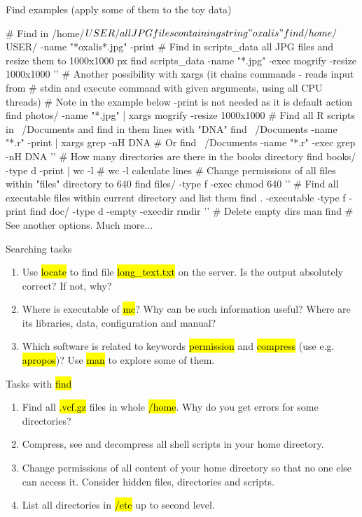 \documentclass[compress, ucs, xelatex, 11pt, xcolor=svgnames, aspectratio=169,
	hyperref={
		bookmarks=true,
		unicode=true,
		colorlinks=true,
		pdftitle={Linux, command line and MetaCentrum},
		plainpages=false,
		pdfauthor={Vojtech Zeisek},
		pdfsubject={Course about use of Linux command line, writing shell scripts and using MetaCentrum of CESNET},
		pdfcreator={XeLaTeX},
		pdfkeywords={Linux, GNU, BASH, shell, command line, MetaCentrum},
		linkcolor=DarkRed, %
		anchorcolor=DarkBlue, %
		citecolor=Indigo, %
		filecolor=NavyBlue, %
		menucolor=DarkMagenta, %
		urlcolor=DarkBlue, %
		pdftex},
	url={hyphens, lowtilde} %
	]{beamer}
\renewcommand{\texttt}[1]{\hl{\ttfamily #1}}
\begin{document}
\begin{frame}[fragile]{Find examples (apply some of them to the toy data)}
	\begin{bashcode}
    # Find in /home/$USER/ all JPG files containing string "oxalis"
    find /home/$USER/ -name "*oxalis*.jpg" -print
    # Find in scripts_data all JPG files and resize them to 1000x1000 px
    find scripts_data -name "*.jpg" -exec mogrify -resize 1000x1000 '{}' \;
    # Another possibility with xargs (it chains commands - reads input from
    # stdin and execute command with given arguments, using all CPU threads)
    # Note in the example below -print is not needed as it is default action
    find photos/ -name "*.jpg" | xargs mogrify -resize 1000x1000
    # Find all R scripts in ~/Documents and find in them lines with "DNA"
    find ~/Documents -name "*.r" -print | xargs grep -nH DNA # Or
    find ~/Documents -name "*.r" -exec grep -nH DNA '{}' \;
    # How many directories are there in the books directory
    find books/ -type d -print | wc -l # wc -l calculate lines
    # Change permissions of all files within "files" directory to 640
    find files/ -type f -exec chmod 640 '{}' \;
    # Find all executable files within current directory and list them
    find . -executable -type f -print
    find doc/ -type d -empty -execdir rmdir '{}' \; # Delete empty dirs
    man find # See another options. Much more...
	\end{bashcode}
\end{frame}

\begin{frame}{Searching tasks}
	\begin{enumerate}
		\item Use \texttt{locate} to find file \texttt{long\_text.txt} on the server. Is the output absolutely correct? If not, why?
		\item Where is executable of \texttt{mc}? Why can be such information useful? Where are its libraries, data, configuration and manual?
		\item Which software is related to keywords \texttt{permission} and \texttt{compress} (use e.g. \texttt{apropos})? Use \texttt{man} to explore some of them.
	\end{enumerate}
	\begin{block}{Tasks with \texttt{find}}
		\begin{enumerate}
			\item Find all \texttt{*.vcf.gz} files in whole \texttt{/home}. Why do you get errors for some directories?
			\item Compress, see and decompress all shell scripts in your home directory.
			\item Change permissions of all content of your home directory so that no one else can access it. Consider hidden files, directories and scripts.
			\item List all directories in \texttt{/etc} up to second level.
		\end{enumerate}
	\end{block}
\end{frame}
\end{document}
